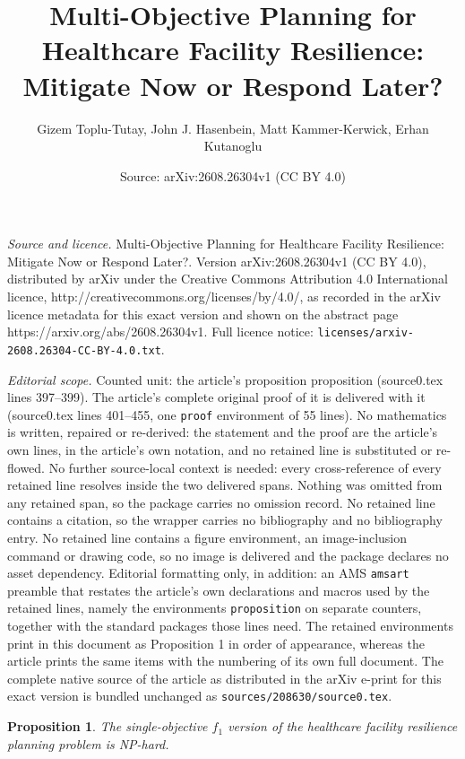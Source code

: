 \documentclass[10pt,a4paper]{amsart}
\title{Multi-Objective Planning for Healthcare Facility Resilience: Mitigate Now or Respond Later?}
\author{Gizem Toplu-Tutay, John J. Hasenbein, Matt Kammer-Kerwick, Erhan Kutanoglu}
\date{Source: arXiv:2608.26304v1 (CC BY 4.0)}
\newtheorem{proposition}{Proposition}
\begin{document}
\maketitle

\noindent\emph{Source and licence.} Multi-Objective Planning for Healthcare Facility Resilience: Mitigate Now or Respond Later?. Version arXiv:2608.26304v1 (CC BY 4.0), distributed by arXiv under the Creative Commons Attribution 4.0 International licence, http://creativecommons.org/licenses/by/4.0/, as recorded in the arXiv licence metadata for this exact version and shown on the abstract page https://arxiv.org/abs/2608.26304v1. Full licence notice: \texttt{licenses/arxiv-2608.26304-CC-BY-4.0.txt}.\par\smallskip

\noindent\textit{Editorial scope.} Counted unit: the article's proposition proposition (source0.tex lines 397--399). The article's complete original proof of it is delivered with it (source0.tex lines 401--455, one \texttt{proof} environment of 55 lines). No mathematics is written, repaired or re-derived: the statement and the proof are the article's own lines, in the article's own notation, and no retained line is substituted or re-flowed.  No further source-local context is needed: every cross-reference of every retained line resolves inside the two delivered spans.  Nothing was omitted from any retained span, so the package carries no omission record.  No retained line contains a citation, so the wrapper carries no bibliography and no bibliography entry.  No retained line contains a figure environment, an image-inclusion command or drawing code, so no image is delivered and the package declares no asset dependency.  Editorial formatting only, in addition: an AMS \texttt{amsart} preamble that restates the article's own declarations and macros used by the retained lines, namely the environments \texttt{proposition} on separate counters, together with the standard packages those lines need.  The retained environments print in this document as Proposition 1 in order of appearance, whereas the article prints the same items with the numbering of its own full document.  The complete native source of the article as distributed in the arXiv e-print for this exact version is bundled unchanged as \texttt{sources/208630/source0.tex}.
\begin{proposition}
The single-objective \(f_1\) version of the healthcare facility resilience planning problem is NP-hard.
\end{proposition}
\end{document}
